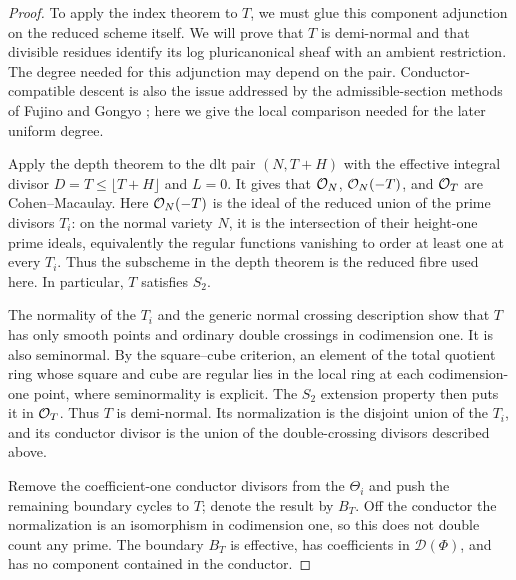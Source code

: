 \begin{proof}
To apply the index theorem to $T$, we must glue this component
adjunction on the reduced scheme itself.  We will prove that $T$ is
demi-normal and that divisible residues identify its log
pluricanonical sheaf with an ambient restriction.  The degree needed
for this adjunction may depend on the pair.  Conductor-compatible
descent is also the issue addressed by the admissible-section methods
of Fujino \cite[Definition~4.1 and Lemma~4.2]{Fujino2000} and Gongyo
\cite[Section~5]{Gongyo2013}; here we give the local comparison needed
for the later uniform degree.

Apply the depth theorem
\cite[Theorem~11.18, author version]{KollarFamilies2023} to the dlt pair
$(N,T+H)$ with the effective integral divisor
$D=T\leq\lfloor T+H\rfloor$ and $L=0$.  It gives that
$\mathcal O_N$, $\mathcal O_N(-T)$, and $\mathcal O_T$ are Cohen--Macaulay.
Here $\mathcal O_N(-T)$ is the ideal of the reduced union of the prime
divisors $T_i$: on the normal variety $N$, it is the intersection of
their height-one prime ideals, equivalently the regular functions
vanishing to order at least one at every $T_i$.  Thus the subscheme in
the depth theorem is the reduced fibre used here.  In particular, $T$
satisfies $S_2$.

The normality of the $T_i$ and the generic normal crossing description
show that $T$ has only smooth points and ordinary double crossings in
codimension one.  It is also seminormal.  By the square--cube
criterion, an element of the total quotient ring whose square and cube
are regular lies in the local ring at each codimension-one point,
where seminormality is explicit.  The $S_2$ extension property then
puts it in $\mathcal O_T$.  Thus $T$ is demi-normal.  Its normalization is the
disjoint union of the $T_i$, and its conductor divisor is the union of
the double-crossing divisors described above.

Remove the coefficient-one conductor divisors from the $\Theta_i$ and
push the remaining boundary cycles to $T$; denote the result by $B_T$.
Off the conductor the normalization is an isomorphism in codimension
one, so this does not double count any prime.  The boundary $B_T$ is
effective, has coefficients in $\mathcal D(\Phi)$, and has no component
contained in the conductor.


\end{proof}
